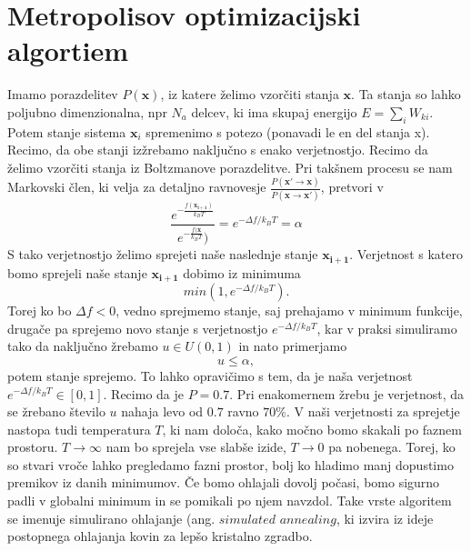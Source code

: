\documentclass[11pt, a4paper]{article}
\renewcommand{\vec}[1]{\mathbf{#1}}
\begin{document}
\section{Metropolisov optimizacijski algortiem}
Imamo porazdelitev $P(\vec{x})$, iz katere želimo vzorčiti stanja $\vec{x}$. Ta stanja so lahko poljubno dimenzionalna, npr $N_a$ delcev, ki ima skupaj energijo $E = \sum_i W_{ki}$.  Potem stanje sistema $\vec{x}_i$ spremenimo s potezo (ponavadi le en del stanja x). Recimo, da obe stanji izžrebamo naključno s enako verjetnostjo. Recimo da želimo vzorčiti stanja iz Boltzmanove porazdelitve. Pri takšnem procesu se nam Markovski člen, ki velja za detaljno ravnovesje $\frac{P(\vec{x'} \rightarrow \vec{x})} {P(\vec{x} \rightarrow \vec{x'})}$, pretvori v 
\begin{equation}
\frac{e^{-\frac{f(\vec{x_{i+1}})}{k_B T}}}{e^{-\frac{f(\vec{x}}{k_B T}})} = e^{- \Delta f / k_B T} = \alpha 
\end{equation}
S tako verjetnostjo želimo sprejeti naše naslednje stanje $\vec{x_{i+1}}$. Verjetnost s katero bomo sprejeli naše stanje $\vec{x_{i+1}}$ dobimo iz minimuma
\begin{equation}
min ( 1, e^{- \Delta f / k_B T} ).
\end{equation}
Torej ko bo $\Delta f  < 0 $, vedno sprejmemo stanje, saj prehajamo v minimum funkcije, drugače pa sprejemo novo stanje s verjetnostjo $e^{- \Delta f / k_B T}$, kar v praksi simuliramo tako da naključno žrebamo $ u \in U(0,1)$ in nato primerjamo 
\begin{equation}
u \leqslant \alpha,
\end{equation}
potem stanje sprejemo. To lahko opravičimo s tem, da je naša verjetnost $e^{- \Delta f / k_B T} \in [0,1]$. Recimo da je $P = 0.7$. Pri enakomernem žrebu je verjetnost, da se žrebano število $u$ nahaja levo od $0.7$ ravno $70 \%$. 
\newline\newline
V naši verjetnosti za sprejetje nastopa tudi temperatura $T$, ki nam določa, kako močno bomo skakali po faznem prostoru. $T \rightarrow \infty$ nam bo sprejela vse slabše izide, $T \rightarrow 0$ pa nobenega. Torej, ko so stvari vroče lahko pregledamo fazni prostor, bolj ko hladimo manj dopustimo premikov iz danih minimumov. Če bomo ohlajali dovolj počasi, bomo sigurno padli v globalni minimum in se pomikali po njem navzdol. Take vrste algoritem se imenuje simulirano ohlajanje (ang. $simulated $ $annealing$, ki izvira iz ideje postopnega ohlajanja kovin za lepšo kristalno zgradbo.
\end{document}
